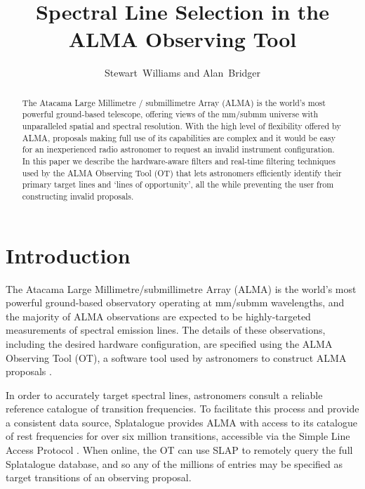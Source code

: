 
\resetcounters




\title{Spectral Line Selection in the ALMA Observing Tool}
\author{Stewart~Williams and Alan~Bridger
}


\begin{abstract}
The Atacama Large Millimetre / submillimetre Array (ALMA) is the world's most powerful ground-based telescope, offering views of the mm/submm universe with unparalleled spatial and spectral resolution. With the high level of flexibility offered by ALMA, proposals making full use of its capabilities are complex and it would be easy for an inexperienced radio astronomer to request an invalid instrument configuration. In this paper we describe the hardware-aware filters and real-time filtering techniques used by the ALMA Observing Tool (OT) that lets astronomers efficiently identify their primary target lines and `lines of opportunity', all the while preventing the user from constructing invalid proposals.
\end{abstract}

\section{Introduction}
\label{sec:introduction}
The Atacama Large Millimetre/submillimetre Array (ALMA) is the world's most powerful ground-based observatory operating at mm/submm wavelengths, and the majority of ALMA observations are expected to be highly-targeted measurements of spectral emission lines. The details of these observations, including the desired hardware configuration, are specified using the ALMA Observing Tool (OT), a software tool used by astronomers to construct ALMA proposals \citep{bridger_2004}.

In order to accurately target spectral lines, astronomers consult a reliable reference catalogue of transition frequencies. To facilitate this process and provide a consistent data source, Splatalogue \citep{splatalogue} provides ALMA with access to its catalogue of rest frequencies for over six million transitions, accessible via the Simple Line Access Protocol \citep[SLAP;][]{SLAP}. When online, the OT can use SLAP to remotely query the full Splatalogue database, and so any of the millions of entries may be specified as target transitions of an observing proposal.

